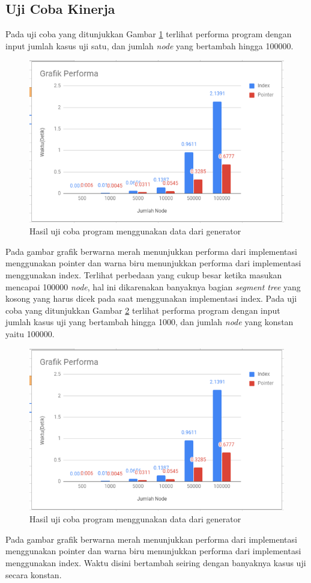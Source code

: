 \documentclass[a4paper]{IEEEtran}
\begin{document}
\subsection{Uji Coba Kinerja}
Pada uji coba yang ditunjukkan Gambar \ref{figure:grafnode} terlihat performa program dengan input jumlah kasus uji satu, dan jumlah \textit{node} yang bertambah hingga 100000.
\begin{figure}[H]
	\centerline{ \includegraphics[scale=0.5]{images/GrafikPerformaNode.PNG}}
	\caption{Hasil uji coba program menggunakan data dari generator}
	\label{figure:grafnode}
\end{figure}
Pada gambar grafik berwarna merah menunjukkan performa dari implementasi menggunakan pointer dan warna biru menunjukkan performa dari implementasi menggunakan index. Terlihat perbedaan yang cukup besar ketika masukan mencapai 100000 \textit{node}, hal ini dikarenakan banyaknya bagian \textit{segment tree} yang kosong yang harus dicek pada saat menggunakan implementasi index.
Pada uji coba yang ditunjukkan Gambar \ref{figure:graftestcase} terlihat performa program dengan input jumlah kasus uji yang bertambah hingga 1000, dan jumlah \textit{node} yang konstan yaitu 100000.
\begin{figure}[H]
	\centerline{ \includegraphics[scale=0.5]{images/GrafikPerformaNode.PNG}}
	\caption{Hasil uji coba program menggunakan data dari generator}
	\label{figure:graftestcase}
\end{figure}
Pada gambar grafik berwarna merah menunjukkan performa dari implementasi menggunakan pointer dan warna biru menunjukkan performa dari implementasi menggunakan index. Waktu disini bertambah seiring dengan banyaknya kasus uji secara konstan.
\end{document}
